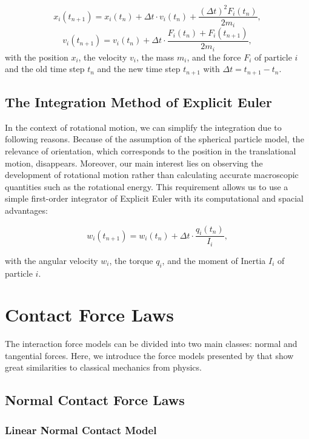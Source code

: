 \documentclass[11pt,
               a4paper,
               bibtotoc,
               idxtotoc,
               headsepline,
               footsepline,
               footexclude,
               BCOR12mm,
               DIV13,
               openany,   %
               ]
               {scrbook}
\begin{document}
\begin{equation}
	x_i(t_{n+1}) = x_i(t_n) + \Delta t \cdot v_i(t_n) + \frac{(\Delta t)^2 F_i(t_n)}{2m_i}, 
\end{equation}
\begin{equation}
	v_i(t_{n+1}) = v_i(t_n) + \Delta t \cdot \frac{F_i(t_n) + F_i(t_{n+1})}{2m_i},
\end{equation}
with the position $x_i$, the velocity $v_i$, the mass $m_i$, and the force $F_i$ of particle $i$ and the old time step $t_n$ and the new time step $t_{n+1}$ with $\Delta t = t_{n+1} - t_n$.

\section{The Integration Method of Explicit Euler}
In the context of rotational motion, we can simplify the integration due to following reasons. Because of the assumption of the spherical particle model, the relevance of orientation, which corresponds to the position in the translational motion, disappears. Moreover, our main interest lies on observing the development of rotational motion rather than calculating accurate macroscopic quantities such as the rotational energy. This requirement allows us to use a simple first-order integrator of Explicit Euler with its computational and spacial advantages:

\begin{equation}
	w_i(t_{n+1}) = w_i(t_n) + \Delta t \cdot \frac{q_i(t_n)}{I_i},
\end{equation}

with the angular velocity $w_i$, the torque $q_i$, and the moment of Inertia $I_i$ of particle $i$.

\chapter{Contact Force Laws}

The interaction force models can be divided into two main classes: normal and tangential forces. Here, we introduce the force models presented by \cite{Luding2008} that show great similarities to classical mechanics from physics.

\section{Normal Contact Force Laws}
\subsection{Linear Normal Contact Model}
\end{document}
